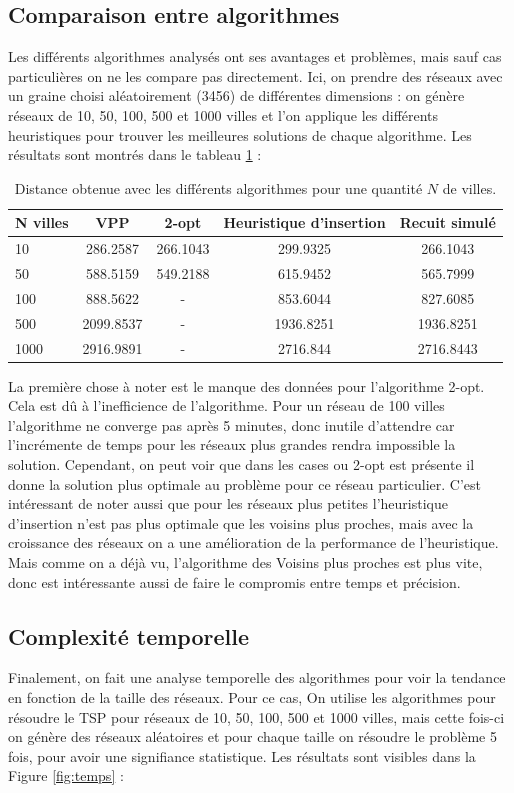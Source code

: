 \documentclass[a4paper,11pt,fleqn]{article}
\begin{document}
\subsection*{Comparaison entre algorithmes}
Les différents algorithmes analysés ont ses avantages et problèmes, mais sauf cas particulières on ne les compare pas directement. Ici, on prendre des réseaux avec un graine choisi aléatoirement (3456) de différentes dimensions : on génère réseaux de 10, 50, 100, 500 et 1000 villes et l'on applique les différents heuristiques pour trouver les meilleures solutions de chaque algorithme. Les résultats sont montrés dans le tableau \ref{tab:distances} : 
\begin{table}[H]
    \centering
    \caption{Distance obtenue avec les différents algorithmes pour une quantité $N$ de villes.}
    \label{tab:distances}
    \begin{tabular}{lcccc}
        \hline
        N villes & VPP & 2-opt & Heuristique d'insertion & Recuit simulé \\ \hline\hline
        10  & 286.2587  & 266.1043  & 299.9325 & 266.1043 \\
        50  & 588.5159  & 549.2188  & 615.9452 & 565.7999 \\
        100 & 888.5622 & - & 853.6044 & 827.6085 \\
        500 & 2099.8537 & - & 1936.8251 & 1936.8251 \\
        1000 & 2916.9891 & - & 2716.844 & 2716.8443  \\ \hline
    \end{tabular}
\end{table}

La première chose à noter est le manque des données pour l'algorithme 2-opt. Cela est dû à l'inefficience de l’algorithme. Pour un réseau de 100 villes l'algorithme ne converge pas après 5 minutes, donc inutile d'attendre car l’incrémente de temps pour les réseaux plus grandes rendra impossible la solution. Cependant, on peut voir que dans les cases ou 2-opt est présente il donne la solution plus optimale au problème pour ce réseau particulier. C'est intéressant de noter aussi que pour les réseaux plus petites l'heuristique d'insertion n'est pas plus optimale que les voisins plus proches, mais avec la croissance des réseaux on a une amélioration de la performance de l'heuristique. Mais comme on a déjà vu, l'algorithme des Voisins plus proches est plus vite, donc est intéressante aussi de faire le compromis entre temps et précision.

\subsection*{Complexité temporelle}
Finalement, on fait une analyse temporelle des algorithmes pour voir la tendance en fonction de la taille des réseaux. Pour ce cas, On utilise les algorithmes pour résoudre le TSP pour réseaux de 10, 50, 100, 500 et 1000 villes, mais cette fois-ci on génère des réseaux aléatoires et pour chaque taille on résoudre le problème 5 fois, pour avoir une signifiance statistique. Les résultats sont visibles dans la Figure \ref{fig:temps} :
\end{document}
